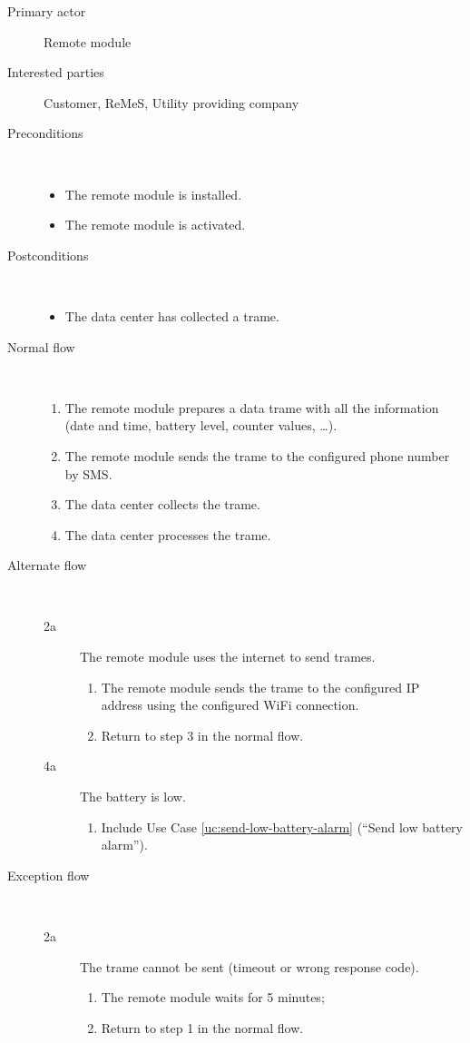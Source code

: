 \begin{description}
	\item[Primary actor] Remote module
	\item[Interested parties] Customer, ReMeS, Utility providing company 
	\item[Preconditions] \ 
	\begin{itemize}
		\item The remote module is installed.
		\item The remote module is activated.
	\end{itemize}
	\item[Postconditions] \ 
	\begin{itemize}
		\item The data center has collected a trame.
	\end{itemize}
	\item[Normal flow] \ 
	\begin{enumerate}
		\item The remote module prepares a data trame with all the information (date
		and time, battery level, counter values, \ldots).
		\item The remote module sends the trame to the configured phone number by SMS.
		\item The data center collects the trame.
		\item The data center processes the trame.
	\end{enumerate}
	\item[Alternate flow] \ 
	\begin{description}
		\item[2a] The remote module uses the internet to send trames.
		\begin{enumerate}
			\item The remote module sends the trame to the configured IP address using
			the configured WiFi connection.
			\item Return to step 3 in the normal flow.
		\end{enumerate}
		\item[4a] The battery is low.
		\begin{enumerate}
			\item Include Use Case \ref{uc:send-low-battery-alarm} (``Send low battery
			alarm'').
		\end{enumerate}
	\end{description}
	\item[Exception flow] \ 
	\begin{description}
		\item[2a] The trame cannot be sent (timeout or wrong response code).
		\begin{enumerate}
			\item The remote module waits for 5 minutes;
			\item Return to step 1 in the normal flow.  
		\end{enumerate}
	\end{description}
\end{description}